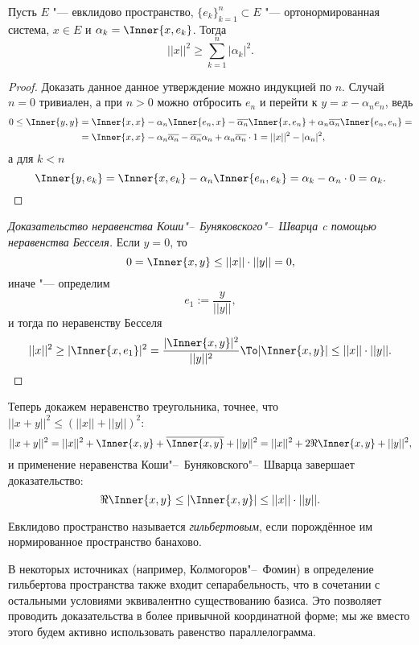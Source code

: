\documentclass[main]{subfiles}
\begin{document}
\begin{proposition}
  Пусть \( E \) "--- евклидово пространство,
  \( {\{ e_k \}}_{k = 1}^n \subset E \) "--- ортонормированная система,
  \( x \in E \) и \( \alpha_k = \Inner{x, e_k} \). Тогда
  \[ ||x||^2 \ge \sum_{k = 1}^{n} |\alpha_k|^2. \]
\end{proposition}
\begin{proof}
  Доказать данное данное утверждение можно индукцией по \( n \).
  Случай \( n = 0 \) тривиален, а при \( n > 0 \) можно
  отбросить \( e_n \) и перейти к \( y = x - \alpha_n e_n \),
  ведь 
  \begin{align}
    0 \le \Inner{y, y} &=
    \Inner{x, x} - \alpha_n \Inner{e_n, x}
    - \overline{\alpha_n} \Inner{x, e_n}
    + \alpha_n \overline{\alpha_n} \Inner{e_n, e_n} = \\
    &= \Inner{x, x} - \alpha_n \overline{\alpha_n}
    - \overline{\alpha_n} \alpha_n +
    \alpha_n \overline{\alpha_n} \cdot 1 =
    ||x||^2 - |\alpha_n|^2,
  \end{align}
  а для \( k < n \)
  \[
    \Inner{y, e_k} =
    \Inner{x, e_k} - \alpha_n \Inner{e_n, e_k} =
    \alpha_k - \alpha_n \cdot 0 =
    \alpha_k. \qedhere
  \]
\end{proof}

\begin{proof}[Доказательство неравенства Коши"--~Буняковского"--~Шварца
  c помощью неравенства Бесселя]
  Если \( y = 0 \), то
  \[ 0 = \Inner{x, y} \le ||x|| \cdot ||y|| = 0, \]
  иначе "--- определим
  \[
    e_1 := \frac{y}{||y||},
  \]
  и тогда по неравенству Бесселя
  \[
    ||x||^2 \ge |\Inner{x, e_1}|^2 =
    \frac{|\Inner{x, y}|^2}{||y||^2} \To
    |\Inner{x, y}| \le ||x|| \cdot ||y||. \qedhere
  \]
\end{proof}

Теперь докажем неравенство треугольника, точнее, что
\( ||x + y||^2 \le {(||x|| + ||y||)}^2 \):
\[
  ||x + y||^2 =
  ||x||^2 + \Inner{x, y} + \overline{\Inner{x, y}} + ||y||^2 =
  ||x||^2 + 2 \Re \Inner{x, y} + ||y||^2,
\]
и применение неравенства Коши"--~Буняковского"--~Шварца
завершает доказательство:
\[
  \Re \Inner{x, y} \le |\Inner{x, y}| \le ||x|| \cdot ||y||.
\]

\begin{definition}
  Евклидово пространство называется \emph{гильбертовым},
  если порождённое им нормированное пространство
  банахово.
\end{definition}

\begin{remark}
  В некоторых источниках (например, Колмогоров"--~Фомин)
  в определение гильбертова пространства также входит
  сепарабельность, что в сочетании с остальными
  условиями эквивалентно существованию базиса.
  Это позволяет проводить доказательства в более
  привычной координатной форме;
  мы же вместо этого будем активно использовать
  равенство параллелограмма.
\end{remark}
\end{document}
